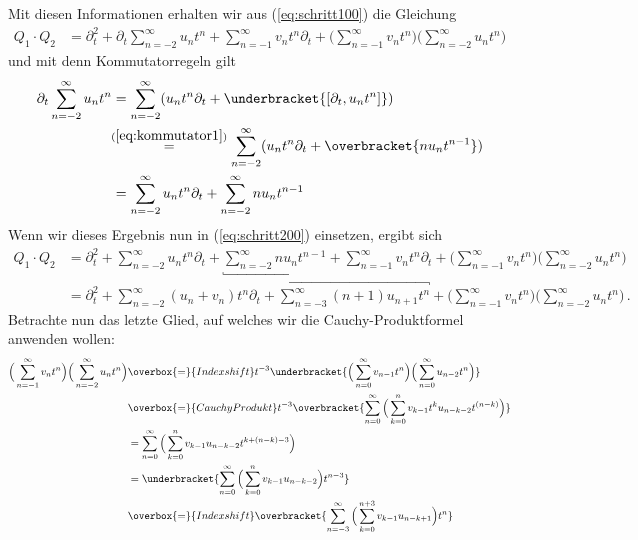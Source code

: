 Mit diesen Informationen erhalten wir aus (\ref{eq:schritt100}) die Gleichung
\begin{align} \label{eq:schritt200}
Q_1\cdot Q_2&=\partial_t^2 + \partial_t \sum_{n=-2}^\infty u_n t^n
  + \sum_{n=-1}^\infty v_nt^n \partial_t
  + \Big(\sum_{n=-1}^\infty v_nt^n \Big)\Big( \sum_{n=-2}^\infty u_n t^n \Big)
\end{align}
und mit denn Kommutatorregeln %
gilt
\begin{align*}
\partial_t \sum_{n=-2}^\infty u_n t^n &=
  \sum_{n=-2}^\infty (u_nt^n\partial_t + \underbracket{[\partial_t,u_nt^n]})
\\&\!\!\overset{{(\ref{eq:kommutator1})}}{=}
  \sum_{n=-2}^\infty (u_nt^n\partial_t +\overbracket{ nu_nt^{n-1}})
\\&= \sum_{n=-2}^\infty u_nt^n\partial_t + \sum_{n=-2}^\infty nu_nt^{n-1}
\end{align*}
Wenn wir dieses Ergebnis nun in (\ref{eq:schritt200}) einsetzen, ergibt sich
\begin{equation} \label{eq:schritt300}
  \begin{aligned}
Q_1\cdot Q_2&=\partial_t^2 + \sum_{n=-2}^\infty u_nt^n\partial_t
  + \underbracket{\sum_{n=-2}^\infty nu_nt^{n-1}}
  + \sum_{n=-1}^\infty v_nt^n \partial_t
  + \Big(\sum_{n=-1}^\infty v_nt^n \Big)\Big( \sum_{n=-2}^\infty u_n t^n \Big)
\\&=\partial_t^2 + \sum_{n=-2}^\infty (u_n+v_n)t^n \partial_t
  + \overbracket{\sum_{n=-3}^\infty (n+1)u_{n+1}t^{n}}
  + \Big(\sum_{n=-1}^\infty v_nt^n \Big)\Big( \sum_{n=-2}^\infty u_n t^n \Big)
  \,.
  \end{aligned}
\end{equation}
Betrachte nun das letzte Glied, auf welches wir die Cauchy-Produktformel
anwenden wollen: %
\begin{align*}
\Big(\sum_{n=-1}^\infty v_nt^n \Big)\Big( \sum_{n=-2}^\infty u_n t^n \Big)
  &\overbox{=}{Indexshift} t^{-3}
  \underbracket{\Big(\sum_{n=0}^\infty v_{n-1}t^{n} \Big)
  \Big( \sum_{n=0}^\infty u_{n-2} t^{n} \Big)}
\\&\overbox{=}{Cauchy Produkt} t^{-3} \overbracket{\sum_{n=0}^\infty
  \Big( \sum_{k=0}^n v_{k-1}t^{k} u_{n-k-2} t^{(n-k)} \Big)}
\\&= \sum_{n=0}^\infty \Big( \sum_{k=0}^n v_{k-1}u_{n-k-2}t^{k+(n-k)-3} \Big)
\\&= \underbracket{
  \sum_{n=0}^\infty \Big( \sum_{k=0}^n v_{k-1} u_{n-k-2} \Big) t^{n-3}}
\\&\overbox{=}{Indexshift} \overbracket{
  \sum_{n=-3}^\infty \Big( \sum_{k=0}^{n+3} v_{k-1} u_{n-k+1} \Big) t^{n} }
\end{align*}
